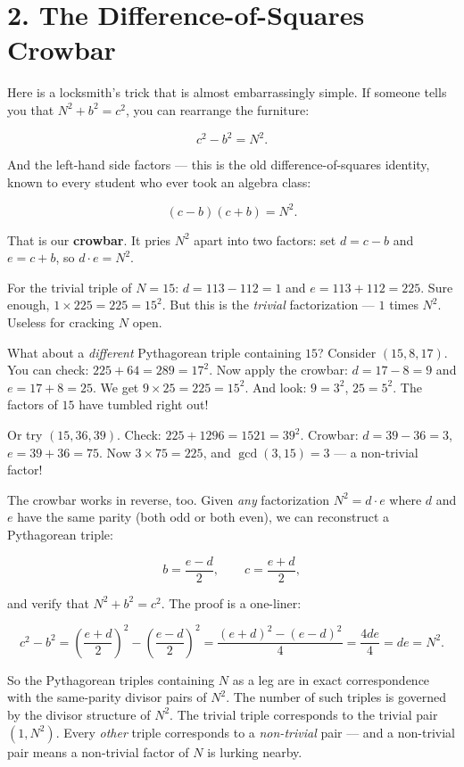 \section{2. The Difference-of-Squares Crowbar}\label{ch14-the-difference-of-squares-crowbar}

Here is a locksmith's trick that is almost embarrassingly simple. If someone tells you that \(N^2 + b^2 = c^2\), you can rearrange the furniture:

\[c^2 - b^2 = N^2.\]

And the left-hand side factors --- this is the old difference-of-squares identity, known to every student who ever took an algebra class:

\[(c - b)(c + b) = N^2.\]

That is our \textbf{crowbar}. It pries \(N^2\) apart into two factors: set \(d = c - b\) and \(e = c + b\), so \(d \cdot e = N^2\).

For the trivial triple of \(N = 15\): \(d = 113 - 112 = 1\) and \(e = 113 + 112 = 225\). Sure enough, \(1 \times 225 = 225 = 15^2\). But this is the \emph{trivial} factorization --- \(1\) times \(N^2\). Useless for cracking \(N\) open.

What about a \emph{different} Pythagorean triple containing \(15\)? Consider \((15, 8, 17)\). You can check: \(225 + 64 = 289 = 17^2\). Now apply the crowbar: \(d = 17 - 8 = 9\) and \(e = 17 + 8 = 25\). We get \(9 \times 25 = 225 = 15^2\). And look: \(9 = 3^2\), \(25 = 5^2\). The factors of \(15\) have tumbled right out!

Or try \((15, 36, 39)\). Check: \(225 + 1296 = 1521 = 39^2\). Crowbar: \(d = 39 - 36 = 3\), \(e = 39 + 36 = 75\). Now \(3 \times 75 = 225\), and \(\gcd(3, 15) = 3\) --- a non-trivial factor!

The crowbar works in reverse, too. Given \emph{any} factorization \(N^2 = d \cdot e\) where \(d\) and \(e\) have the same parity (both odd or both even), we can reconstruct a Pythagorean triple:

\[b = \frac{e - d}{2}, \qquad c = \frac{e + d}{2},\]

and verify that \(N^2 + b^2 = c^2\). The proof is a one-liner:

\[c^2 - b^2 = \left(\frac{e+d}{2}\right)^{\!2} - \left(\frac{e-d}{2}\right)^{\!2} = \frac{(e+d)^2 - (e-d)^2}{4} = \frac{4de}{4} = de = N^2.\]

So the Pythagorean triples containing \(N\) as a leg are in exact correspondence with the same-parity divisor pairs of \(N^2\). The number of such triples is governed by the divisor structure of \(N^2\). The trivial triple corresponds to the trivial pair \((1, N^2)\). Every \emph{other} triple corresponds to a \emph{non-trivial} pair --- and a non-trivial pair means a non-trivial factor of \(N\) is lurking nearby.

